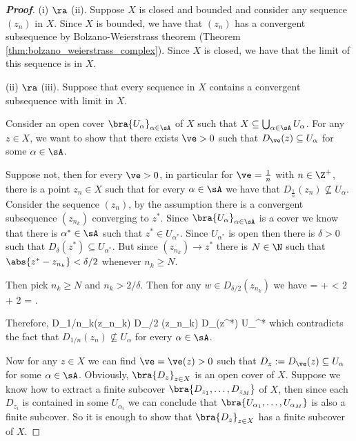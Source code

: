 \begin{proof}[\bf Proof]
\ben
\item [(i)] $\ra$ (ii). Suppose $X$ is closed and bounded and consider any sequence $(z_n)$ in $X$. Since $X$ is bounded, we have that $(z_n)$ has a convergent subsequence by Bolzano-Weierstrass theorem (Theorem \ref{thm:bolzano_weierstrass_complex}). Since $X$ is closed, we have that the limit of this sequence is in $X$.

\item [(ii)] $\ra$ (iii). Suppose that every sequence in $X$ contains a convergent subsequence with limit in $X$.

Consider an open cover $\bra{U_\alpha}_{\alpha\in \sA}$ of $X$ such that $X\subseteq \bigcup_{\alpha\in\sA} U_{\alpha}$. For any $z\in X$, we want to show that there exists $\ve>0$ such that $D_\ve(z) \subseteq U_\alpha$ for some $\alpha\in \sA$.

Suppose not, then for every $\ve>0$, in particular for $\ve = \frac 1n$ with $n\in \Z^+$, there is a point $z_n\in X$ such that for every $\alpha\in \sA$ we have that $D_{\frac 1n}(z_n) \not\subseteq U_\alpha$. Consider the sequence $(z_n)$, by the assumption there is a convergent subsequence $(z_{n_k})$ converging to $z^*$. Since $\bra{U_{\alpha}}_{\alpha\in \sA}$ is a cover we know that there is $\alpha^* \in \sA$ such that $z^* \in U_{\alpha^*}$. Since $U_{\alpha^*}$ is open then there is $\delta >0$ such that $D_{\delta}(z^*) \subseteq U_{\alpha^*}$. But since $(z_{n_k})\to z^*$ there is $N\in \N$ such that $\abs{z^* - z_{n_k}} < \delta/2$ whenever $n_k\geq N$.

Then pick $n_k\geq N$ and $n_k > 2/\delta$. Then for any $w\in D_{\delta/2}(z_{n_k})$ we have
\be
{} =  \leq {} +  < \frac {\delta}2 + \frac{\delta}2 = \delta.
\ee

Therefore,
\be
D_{1/n_k}(z_{n_k}) \subseteq D_{\delta/2} (z_{n_k}) \subseteq D_\delta(z^*) \subseteq U_{\alpha^*}
\ee
which contradicts the fact that $D_{1/n}(z_n) \not\subseteq U_{\alpha}$ for every $\alpha\in \sA$.

Now for any $z\in X$ we can find $\ve= \ve(z)>0$ such that $D_z := D_\ve(z) \subseteq U_{\alpha}$ for some $\alpha\in \sA$. Obviously, $\bra{D_z}_{z\in X}$ is an open cover of $X$. Suppose we know how to extract a finite subcover $\bra{D_{z_1},\dots,D_{z_M}}$ of $X$, then since each $D_{z_i}$ is contained in some $U_{\alpha_i}$ we can conclude that $\bra{U_{\alpha_1},\dots,U_{\alpha_M}}$ is also a finite subcover. So it is enough to show that $\bra{D_{z}}_{z\in X}$ has a finite subcover of $X$.


\end{proof}
